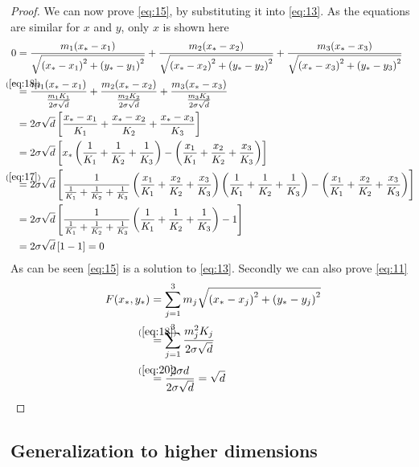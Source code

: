 \begin{proof}
We can now prove \cref{eq:15}, by substituting it into \cref{eq:13}. As the
equations are similar for $x$ and $y$, only $x$ is shown here
%
\begin{align}
  0
  &= \frac{m_1 (x_\ast - x_1)}{\sqrt{{(x_\ast - x_1)}^2 + {(y_\ast - y_1)}^2}} +
    \frac{m_2 (x_\ast - x_2)}{\sqrt{{(x_\ast - x_2)}^2 + {(y_\ast - y_2)}^2}} +
    \frac{m_3 (x_\ast - x_3)}{\sqrt{{(x_\ast - x_3)}^2 + {(y_\ast - y_3)}^2}} \\
  &\stackrel{\mathclap{(\ref{eq:18})}}=
    \frac{m_1 (x_\ast - x_1)}{\frac{m_1 K_1}{2 \sigma \sqrt{d}}} +
    \frac{m_2 (x_\ast - x_2)}{\frac{m_2 K_2}{2 \sigma \sqrt{d}}} +
    \frac{m_3 (x_\ast - x_3)}{\frac{m_3 K_3}{2 \sigma \sqrt{d}}} \\
  &= 2 \sigma \sqrt{d} \left[
    \frac{x_\ast - x_1}{K_1} +
    \frac{x_\ast - x_2}{K_2} +
    \frac{x_\ast - x_3}{K_3} \right] \\
  &= 2 \sigma \sqrt{d} \left[
    x_\ast \left( \frac{1}{K_1} + \frac{1}{K_2} + \frac{1}{K_3} \right) -
    \left( \frac{x_1}{K_1} + \frac{x_2}{K_2} + \frac{x_3}{K_3} \right)
    \right] \\
  &\stackrel{\mathclap{(\ref{eq:17})}}=
    2 \sigma \sqrt{d} \left[
    \frac{1}{\frac{1}{K_1} + \frac{1}{K_2} + \frac{1}{K_3}} \left( \frac{x_1}{K_1} +
    \frac{x_2}{K_2} + \frac{x_3}{K_3} \right)
    \left( \frac{1}{K_1} + \frac{1}{K_2} + \frac{1}{K_3} \right) -
    \left( \frac{x_1}{K_1} + \frac{x_2}{K_2} + \frac{x_3}{K_3} \right)
    \right] \\
  &= 2 \sigma \sqrt{d} \left[
    \frac{1}{\frac{1}{K_1} + \frac{1}{K_2} + \frac{1}{K_3}}
    \left( \frac{1}{K_1} + \frac{1}{K_2} + \frac{1}{K_3} \right) -
    1 \right] \\
  &= 2 \sigma \sqrt{d} \left[ 1 - 1 \right] = 0
\end{align}
%
As can be seen \cref{eq:15} is a solution to \cref{eq:13}. Secondly we can also
prove \cref{eq:11}
%
\begin{align}
  F(x_\ast,y_\ast)
  &= \sum_{j=1}^3 m_j \sqrt{{(x_\ast - x_j)}^2 + {(y_\ast - y_j)}^2} \\
  &\stackrel{\mathclap{(\ref{eq:18})}}{=}
    \sum_{j=1}^3 \frac{m_j^2 K_j}{2 \sigma \sqrt{d}} \\
  &\stackrel{\mathclap{(\ref{eq:20})}}{=}
    \frac{2 \sigma d}{2 \sigma \sqrt{d}} = \sqrt{d}
\end{align}
\end{proof}

\subsection{Generalization to higher dimensions}
\label{sec:gener-high-dimens}

